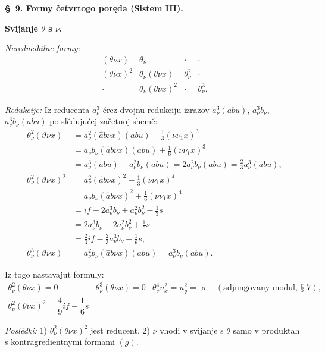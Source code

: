 \documentclass[11pt]{article}
\begin{document}
\begin{center}
\textbf{\S\ 9. \quad Formy četvrtogo poręda (Sistem III).}
\end{center}

\noindent\textbf{Svijanje $\theta$ s $\nu$.}

\noindent\textit{Nereducibilne formy:}
\[
\begin{array}{cccc}
(\theta\nu x)&\theta_\nu&\cdot&\cdot\\
(\theta\nu x)^2&\theta_\nu(\theta\nu x)&\theta_\nu^2&\cdot\\
\cdot&\theta_\nu(\theta\nu x)^2&\cdot&\theta_\nu^3.
\end{array}
\]

\noindent\textit{Redukcije:} Iz reducenta $a_\nu^3$ črez dvojnu redukciju izrazov $a_\nu^3(abu)$, $a_\nu^3b_\nu$, $a_\nu^3b_\nu(abu)$ po slědujućej začetnoj shemě:
\[
\begin{aligned}
\theta_\nu^2(\vartheta\nu x)
&=a_\nu^2(\widehat{a}b\nu x)(abu)-\frac13(\nu\nu_1x)^3\\
&=a_\nu b_\nu(\widehat{a}b\nu x)(abu)+\frac16(\nu\nu_1x)^3\\
&=a_\nu^3(abu)-a_\nu^2b_\nu(abu)
=2a_\nu^2b_\nu(abu)=\frac23a_\nu^3(abu),\\[0.4em]
\theta_\nu^2(\vartheta\nu x)^2
&=a_\nu^2(\widehat{a}b\nu x)^2-\frac13(\nu\nu_1x)^4\\
&=a_\nu b_\nu(\widehat{a}b\nu x)^2+\frac16(\nu\nu_1x)^4\\
&=if-2a_\nu^3b_\nu+a_\nu^2b_\nu^2-\frac13s\\
&=2a_\nu^3b_\nu-2a_\nu^2b_\nu^2+\frac16s\\
&=\frac23if-\frac23a_\nu^3b_\nu-\frac16s,\\[0.4em]
\theta_\nu^3(\vartheta\nu x)
&=a_\nu^2b_\nu(\widehat{a}b\nu x)(abu)=a_\nu^3b_\nu(abu).
\end{aligned}
\]

Iz togo nastavajut formuly:
\[
\tag{9}
\begin{array}{c|c|c}
\theta_\nu^2(\theta\nu x)=0
& \theta_\nu^3(\theta\nu x)=0
& \theta_\nu^4u_x^2=u_\varrho^2=\varrho\quad(\text{adjungovany modul, § 7}),\\[0.6em]
\theta_\nu^2(\theta\nu x)^2=\dfrac49 i f-\dfrac16s
& &
\end{array}
\]

\noindent\textit{Poslědki:} 1) $\theta_\nu^2(\theta\nu x)^2$ jest reducent. 2) $\nu$ vhodi v svijanje s $\theta$ samo v produktah s kontragredientnymi formami $(g)$.
\end{document}
